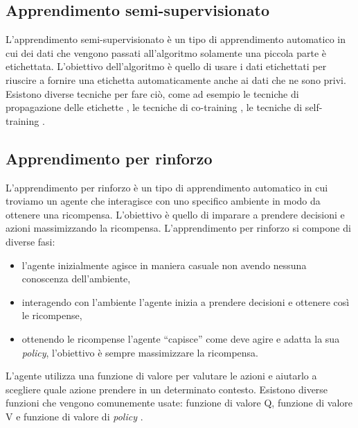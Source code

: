 \documentclass[12pt,italian]{report}
\begin{document}
	\subsection{Apprendimento semi-supervisionato}
	L'apprendimento semi-supervisionato è un tipo di apprendimento automatico in cui dei dati che vengono passati all'algoritmo solamente una piccola parte è etichettata. L'obiettivo dell'algoritmo è quello di usare i dati etichettati per riuscire a fornire una etichetta automaticamente anche ai dati che ne sono privi. Esistono diverse tecniche per fare ciò, come ad esempio le tecniche di propagazione delle etichette \cite{LearningfromLabeledandUnlabeledDatawithLabelPropagation}, le tecniche di co-training \cite{10.1145/279943.279962}, le tecniche di self-training \cite{inproceedings}.
	
	
	\subsection{Apprendimento per rinforzo}
	L'apprendimento per rinforzo è un tipo di apprendimento automatico in cui troviamo un agente che interagisce con uno specifico ambiente in modo da ottenere una ricompensa. L'obiettivo è quello di imparare a prendere decisioni e azioni massimizzando la ricompensa. L'apprendimento per rinforzo si compone di diverse fasi:
	\begin{itemize}
		\item l'agente inizialmente agisce in maniera casuale non avendo nessuna conoscenza dell'ambiente, 
		\item interagendo con l'ambiente l'agente inizia a prendere decisioni e ottenere così le ricompense,
		\item ottenendo le ricompense l'agente ``capisce'' come deve agire e adatta la sua \textit{policy}, l'obiettivo è sempre massimizzare la ricompensa.
	\end{itemize}
	L'agente utilizza una funzione di valore per valutare le azioni e aiutarlo a scegliere quale azione prendere in un determinato contesto. Esistono diverse funzioni che vengono comunemente usate: funzione di valore Q, funzione di valore V e  funzione di valore di \textit{policy} \cite{busoniu2010reinforcement}.
	
\end{document}
